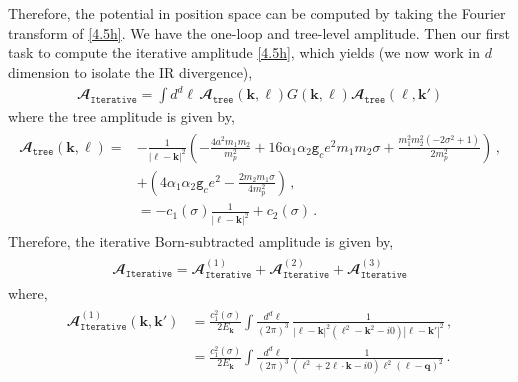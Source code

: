 \\\\
Therefore, the potential in position space can be computed by taking the Fourier transform of \eqref{4.5h}. We have the one-loop and tree-level amplitude. Then our first task to compute the iterative amplitude  \eqref{4.5h}, which yields (we now work in $d$ dimension to isolate the IR divergence),
\begin{align}
  \mathbfcal{A}_{\texttt{Iterative}}=  \int d^d\boldsymbol{\ell}\,\mathbfcal{A}_{\texttt{tree}}(\boldsymbol{k},\boldsymbol{\ell}) G(\boldsymbol{k},\boldsymbol{\ell})\mathbfcal{A}_{\texttt{tree}}(\boldsymbol{\ell},\boldsymbol{k'})
\end{align}
where the tree amplitude is given by,
\begin{align}
\begin{split}
    \mathbfcal{A}_{\texttt{tree}}(\boldsymbol{k},\boldsymbol{\ell})=&-\frac{1}{|\boldsymbol{\ell}-\boldsymbol{k}|^2}\left(-\frac{4  a^2 m_1 m_2}{m_p^2}+16  \alpha _1 \alpha _2 \texttt{g}_ce^2 m_1 m_2 \sigma  +\frac{ m_1^2 m_2^2 \left(-2 \sigma ^2 +1\right)}{2 m_p^2}\right)\,,\\ &
    +\left(4  \alpha _1 \alpha _2 \texttt{g}_c e^2 -\frac{ 2 m_2 m_1 \sigma   }{4  m_p^2}\right)\,,\\ &
    =-c_{1}(\sigma)\frac{1}{|\boldsymbol{\ell}-\boldsymbol{k}|^2}+c_2(\sigma)\,.
    \end{split}
    \end{align}
Therefore, the iterative Born-subtracted amplitude is given by,
\begin{align}
    \begin{split}
        \mathbfcal{A}_{\texttt{Iterative}}=\mathbfcal{A}^{(1)}_{\texttt{Iterative}}+\mathbfcal{A}^{(2)}_{\texttt{Iterative}}+\mathbfcal{A}^{(3)}_{\texttt{Iterative}}
    \end{split}
\end{align}
where,
\begin{align}
    \begin{split}\mathbfcal{A}^{(1)}_{\texttt{Iterative}}(\boldsymbol{k},\boldsymbol{k'})&= \frac{c_1^2(\sigma)}{2E_{\boldsymbol{k}}} \int \frac{d^d\boldsymbol{\ell}}{(2\pi)^3}\,\frac{1}{|\boldsymbol{\ell}-\boldsymbol{k}|^2(\boldsymbol{\ell}^2-\boldsymbol{k}^2-i0)|\boldsymbol{\ell}-\boldsymbol{k'}|^2}\,,\\ &
    =\frac{c_1^2(\sigma)}{2E_{\boldsymbol{k}}}  \int \frac{d^d\boldsymbol{\ell}}{(2\pi)^3}\frac{1}{(\boldsymbol{\ell}^2+2\boldsymbol{\ell}\cdot \boldsymbol{k}-i0)\boldsymbol{\ell}^2(\boldsymbol{\ell}-\boldsymbol{q})^2}\,.\label{4.20jj}
    \end{split}
\end{align}
